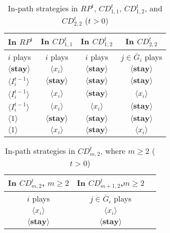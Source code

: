 \documentclass[12pt,letter]{article}
\theoremstyle{definition}
\theoremstyle{remark}
\theoremstyle{claim}
\begin{document}
\begin{table}[ht]
\caption{In-path strategies in $RP^t$, $CD^t_{1,1}$, $CD^t_{1,2}$, and $CD^t_{2,2}$ ($t>0$)}
\label{Table_stg_cdt12}
\begin{center}
\begin{tabular}{l c c c}
In $RP^t$ 	 	&  	In $CD^t_{1,1}$		&  In $CD^t_{1,2}$	  & In $CD^t_{2,2}$ \\
\hline
\hline
$i$ plays 		                             &  	$i$ plays		&				$i$ plays			& $j\in \bar{G}_i$ plays  \\
\hline
$\langle  \textbf{stay} \rangle$ 	& 	$\langle x_i \rangle$	&  $\langle \textbf{stay} \rangle$ &  $\langle \textbf{stay} \rangle$ \\
$\langle  {I^{t-1}_i} \rangle$ 		&  $\langle \textbf{stay} \rangle$	&	$\langle \textbf{stay} \rangle$ &  $\langle \textbf{stay} \rangle$   \\
$\langle  {I^{t-1}_i} \rangle$ 		&  $\langle x_i \rangle$	&	$\langle \textbf{stay} \rangle$ &  $\langle x_i \rangle$    \\
$\langle  {I^{t-1}_i} \rangle$ 		&  $\langle x_i \rangle$	&	$\langle x_i \rangle$ &  $\langle \textbf{stay} \rangle$  \\
$\langle 1 \rangle$ 		             &  $\langle \textbf{stay} \rangle$	&	$\langle \textbf{stay} \rangle$ &  $\langle \textbf{stay} \rangle$\\
$\langle 1 \rangle$ 		             &  $\langle x_i \rangle$	&	$\langle \textbf{stay} \rangle$ & $\langle x_i \rangle$
\end{tabular}
\end{center}
\end{table}

\begin{table}[ht]
\caption{In-path strategies in $CD^t_{m,2}$, where $m\geq 2$ ($t>0$)}
\label{Table_stg_cdtm2}
\begin{center}
\begin{tabular}{c c c}
In $CD^t_{m,2}$, $m\geq 2$ 	 	&  	In $CD^t_{m+1,2}$,$m\geq 2$		& 	\\
\hline
\hline
$i$ plays 		  							&  $j\in \bar{G}_{i}$ plays  								& \\
\hline
$\langle x_i \rangle$ 	& 	$\langle x_i \rangle$	    &  \\
$\langle \textbf{stay} \rangle$		&  $\langle \textbf{stay} \rangle$	&  \\

\end{tabular}
\end{center}
\end{table}
\end{document}
